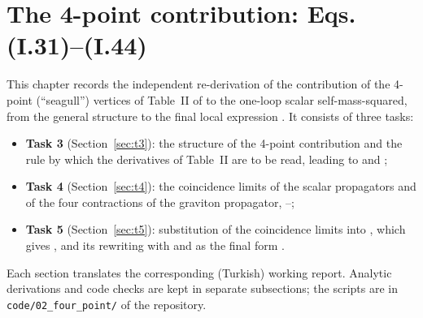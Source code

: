 \providecommand{\chIIc}[1]{i\bigl[#1\bigr](x;x)}          %
\providecommand{\chIIdel}{\delta^D(x-x')}
\providecommand{\chIIM}{M^2_{\rm 4pt}}
\providecommand{\chIIN}{\mathcal N}
\providecommand{\chIIK}{\mathcal K}
\providecommand{\chIIok}{\checkmark}
\providecommand{\chIIno}{\textbf{\textsf{x}}}

\chapter{The 4-point contribution: Eqs. (I.31)--(I.44)}
\label{ch:fourpoint}

This chapter records the independent re-derivation of the contribution of the
4-point (``seagull'') vertices of Table~II of \PI{} to the one-loop scalar
self-mass-squared, from the general structure  to the final local
expression . It consists of three tasks:
\begin{itemize}[nosep]
\item \textbf{Task 3} (Section~\ref{sec:t3}): the structure  of the 4-point
contribution and the rule by which the derivatives of Table~II are to be read, leading
to  and ;
\item \textbf{Task 4} (Section~\ref{sec:t4}): the coincidence limits of the scalar
propagators and of the four contractions of the graviton propagator, --;
\item \textbf{Task 5} (Section~\ref{sec:t5}): substitution of the coincidence limits
into , which gives , and its rewriting with  and  as
the final form .
\end{itemize}
Each section translates the corresponding (Turkish) working report. Analytic
derivations and code checks are kept in separate subsections; the scripts are in
\texttt{code/02\_four\_point/} of the repository.

